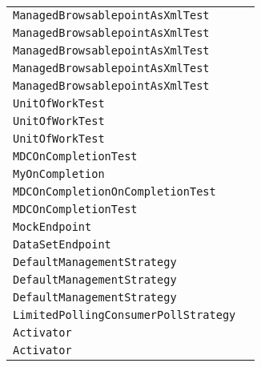 \begin{center}
\begin{tabular}{ll}
\lstinline/ManagedBrowsablepointAsXmlTest/&\raisebox{0pt}{\lstinline/testBrowseablepointAsXmlIncludeBody()/}\\
\lstinline/ManagedBrowsablepointAsXmlTest/&\raisebox{0pt}{\lstinline/testBrowseablepointAsXmlIncludeBody()/}\\
\lstinline/ManagedBrowsablepointAsXmlTest/&\raisebox{0pt}{\lstinline/testBrowseablepointAsXmlIncludeBody()/}\\
\lstinline/ManagedBrowsablepointAsXmlTest/&\raisebox{0pt}{\lstinline/testBrowseablepointAsXmlIncludeBody()/}\\
\lstinline/ManagedBrowsablepointAsXmlTest/&\raisebox{0pt}{\lstinline/testBrowseablepointAsXmlIncludeBody()/}\\
\lstinline/UnitOfWorkTest/&\raisebox{0pt}{\lstinline/testFail()/}\\
\lstinline/UnitOfWorkTest/&\raisebox{0pt}{\lstinline/testException()/}\\
\lstinline/UnitOfWorkTest/&\raisebox{0pt}{\lstinline/testSuccess()/}\\
\lstinline/MDCOnCompletionTest/&\raisebox{0pt}{\lstinline/process(Exchange)/}\\
\lstinline/MyOnCompletion/&\raisebox{0pt}{\lstinline/onDone(Exchange)/}\\
\lstinline/MDCOnCompletionOnCompletionTest/&\raisebox{0pt}{\lstinline/process(Exchange)/}\\
\lstinline/MDCOnCompletionTest/&\raisebox{0pt}{\lstinline/process(Exchange)/}\\
\lstinline/MockEndpoint/&\raisebox{0pt}{\lstinline/assertIsSatisfied(long)/}\\
\lstinline/DataSetEndpoint/&\raisebox{0pt}{\lstinline/doStart()/}\\
\lstinline/DefaultManagementStrategy/&\raisebox{0pt}{\lstinline/setLoadStatisticsEnabled(boolean)/}\\
\lstinline/DefaultManagementStrategy/&\raisebox{0pt}{\lstinline/onlyManageProcessorWithCustomId(boolean)/}\\
\lstinline/DefaultManagementStrategy/&\raisebox{0pt}{\lstinline/setStatisticsLevel(ManagementStatisticsLevel)/}\\
\lstinline/LimitedPollingConsumerPollStrategy/&\raisebox{0pt}{\lstinline/onSuspend(Consumer,Endpoint)/}\\
\lstinline/Activator/&\raisebox{0pt}{\lstinline/stop(BundleContext)/}\\
\lstinline/Activator/&\raisebox{0pt}{\lstinline/stop(BundleContext)/}\\

\end{tabular}
\end{center}
